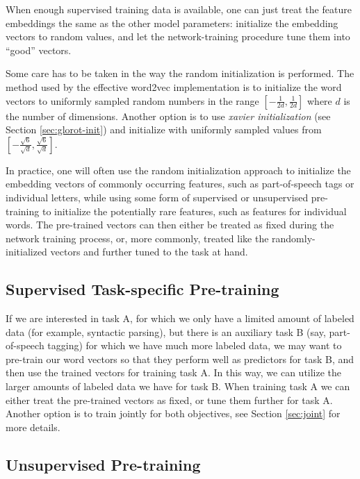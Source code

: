 \documentclass[jair,twoside,11pt,theapa]{article}
\begin{document}
{When enough supervised training data is available, one can just treat the feature
embeddings the same as the other model parameters: initialize the embedding
vectors to random values, and let the network-training procedure tune them into ``good'' vectors. 

Some care has to be taken in the way the random initialization is performed. The
method used by the effective word2vec implementation
\cite{mikolov2013efficient,mikolov2013distributed} is to initialize the word
vectors to uniformly sampled random numbers in the range $[-\frac{1}{2d},
\frac{1}{2d}]$ where $d$ is the number of dimensions.  Another option is to use
\emph{xavier initialization} (see Section \ref{sec:glorot-init}) and initialize with
uniformly
sampled values from $\left[-\frac{\sqrt{6}}{\sqrt{d}}, \frac{\sqrt{6}}{\sqrt{d}}\right]$.

In practice, one will often use the random initialization approach to initialize
the embedding vectors of commonly occurring features, such as part-of-speech
tags or individual letters, while using some form of supervised or unsupervised
pre-training to initialize the potentially rare features, such as features for
individual words.  The pre-trained vectors can then either be treated as fixed
during the network training process, or, more commonly, treated like the
randomly-initialized vectors and further tuned to the task at hand.  

\subsection{Supervised Task-specific Pre-training}

If we are interested in task A, for which we only have a limited amount of
labeled data (for example, syntactic parsing), but there is an auxiliary task B
(say, part-of-speech tagging) for which we have much more labeled data, we may
want to pre-train our word vectors so that they perform well as predictors for task B, and
then use the trained vectors for training task A.  In this way, we can utilize
the larger amounts of labeled data we have for task B.  When training
task A we can either treat the pre-trained vectors as fixed, or tune them
further for task A.
Another option is to train jointly for both objectives, see Section \ref{sec:joint} for more details.

\subsection{Unsupervised Pre-training}

}
\end{document}
